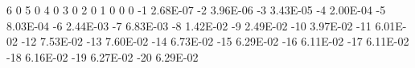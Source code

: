 6	0
5	0
4	0
3	0
2	0
1	0
0	0
-1	2.68E-07
-2	3.96E-06
-3	3.43E-05
-4	2.00E-04
-5	8.03E-04
-6	2.44E-03
-7	6.83E-03
-8	1.42E-02
-9	2.49E-02
-10	3.97E-02
-11	6.01E-02
-12	7.53E-02
-13	7.60E-02
-14	6.73E-02
-15	6.29E-02
-16	6.11E-02
-17	6.11E-02
-18	6.16E-02
-19	6.27E-02
-20	6.29E-02
